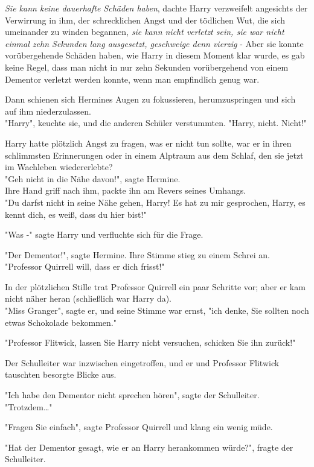 {\emph{Sie kann keine dauerhafte Schäden haben}, dachte Harry verzweifelt angesichts der Verwirrung in ihm, der schrecklichen Angst und der tödlichen Wut, die sich umeinander zu winden begannen, \emph{sie kann nicht verletzt sein, sie war nicht einmal zehn Sekunden lang ausgesetzt, geschweige denn vierzig} - Aber sie konnte vorübergehende Schäden haben, wie Harry in diesem Moment klar wurde, es gab keine Regel, dass man nicht in nur zehn Sekunden vorübergehend von einem Dementor verletzt werden konnte, wenn man empfindlich genug war.

Dann schienen sich Hermines Augen zu fokussieren, herumzuspringen und sich auf ihm niederzulassen.\\ "Harry", keuchte sie, und die anderen Schüler verstummten. "Harry, nicht. Nicht!"

Harry hatte plötzlich Angst zu fragen, was er nicht tun sollte, war er in ihren schlimmsten Erinnerungen oder in einem Alptraum aus dem Schlaf, den sie jetzt im Wachleben wiedererlebte?\\ "Geh nicht in die Nähe davon!", sagte Hermine.\\ Ihre Hand griff nach ihm, packte ihn am Revers seines Umhangs.\\ "Du darfst nicht in seine Nähe gehen, Harry! Es hat zu mir gesprochen, Harry, es kennt dich, es weiß, dass du hier bist!"

"Was -" sagte Harry und verfluchte sich für die Frage.

"Der Dementor!", sagte Hermine. Ihre Stimme stieg zu einem Schrei an. "Professor Quirrell will, dass er dich frisst!"

In der plötzlichen Stille trat Professor Quirrell ein paar Schritte vor; aber er kam nicht näher heran (schließlich war Harry da).\\ "Miss Granger", sagte er, und seine Stimme war ernst, "ich denke, Sie sollten noch etwas Schokolade bekommen."

"Professor Flitwick, lassen Sie Harry nicht versuchen, schicken Sie ihn zurück!"

Der Schulleiter war inzwischen eingetroffen, und er und Professor Flitwick tauschten besorgte Blicke aus.

"Ich habe den Dementor nicht sprechen hören", sagte der Schulleiter. "Trotzdem…"

"Fragen Sie einfach", sagte Professor Quirrell und klang ein wenig müde.

"Hat der Dementor gesagt, wie er an Harry herankommen würde?", fragte der Schulleiter.

}
